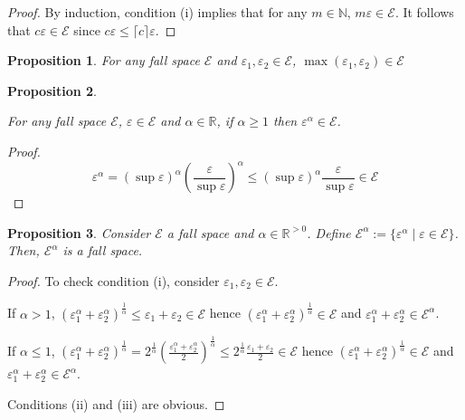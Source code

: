 \documentclass{article}
\numberwithin{equation}{section}
\theoremstyle{definition}
\theoremstyle{plain}
\newtheorem{proposition}{Proposition}[section]
\newcommand{\Nats}{\mathbb{N}}
\newcommand{\Reals}{\mathbb{R}}
\newcommand{\Ceil}[1]{\lceil #1 \rceil}
\begin{document}
\begin{proof}

By induction, condition (i) implies that for any $m \in \Nats$, $m\varepsilon \in \mathcal{E}$. It follows that $c\varepsilon \in \mathcal{E}$ since $c\varepsilon \leq \Ceil{c}\varepsilon$.

\end{proof}

\begin{proposition}

For any fall space $\mathcal{E}$ and $\varepsilon_1, \varepsilon_2 \in \mathcal{E}$, $\max(\varepsilon_1,\varepsilon_2) \in \mathcal{E}$

\end{proposition}


\begin{proposition}
\label{prp:fall_space_closed_wrt_power}

For any fall space $\mathcal{E}$, $\varepsilon \in \mathcal{E}$ and $\alpha \in \Reals$, if $\alpha \geq 1$ then $\varepsilon^\alpha \in \mathcal{E}$.

\end{proposition}

\begin{proof}

$$\varepsilon^\alpha = (\sup \varepsilon)^\alpha (\frac{\varepsilon}{\sup \varepsilon})^\alpha \leq  (\sup \varepsilon)^\alpha \frac{\varepsilon}{\sup \varepsilon} \in \mathcal{E}$$

\end{proof}

\begin{proposition}

Consider $\mathcal{E}$ a fall space and $\alpha \in \Reals^{>0}$. Define ${\mathcal{E}^\alpha := \{\varepsilon^\alpha \mid \varepsilon \in \mathcal{E}\}}$. Then, $\mathcal{E}^\alpha$ is a fall space.

\end{proposition}

\begin{proof}

To check condition (i), consider $\varepsilon_1, \varepsilon_2 \in \mathcal{E}$. 

If $\alpha > 1$, $(\varepsilon_1^\alpha + \varepsilon_2^\alpha)^\frac{1}{\alpha} \leq \varepsilon_1 + \varepsilon_2 \in \mathcal{E}$ hence $(\varepsilon_1^\alpha + \varepsilon_2^\alpha)^\frac{1}{\alpha} \in \mathcal{E}$ and $\varepsilon_1^\alpha + \varepsilon_2^\alpha \in \mathcal{E}^\alpha$.

If $\alpha \leq 1$, $(\varepsilon_1^\alpha + \varepsilon_2^\alpha)^\frac{1}{\alpha} = 2^\frac{1}{\alpha}(\frac{\varepsilon_1^\alpha + \varepsilon_2^\alpha}{2})^\frac{1}{\alpha} \leq 2^\frac{1}{\alpha} \frac{\varepsilon_1+\varepsilon_2}{2} \in \mathcal{E}$ hence $(\varepsilon_1^\alpha + \varepsilon_2^\alpha)^\frac{1}{\alpha} \in \mathcal{E}$ and $\varepsilon_1^\alpha + \varepsilon_2^\alpha \in \mathcal{E}^\alpha$.

Conditions (ii) and (iii) are obvious.

\end{proof}
\end{document}
